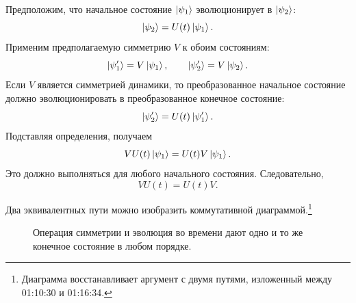 Предположим, что начальное состояние \(\left\lvert\psi_1\right\rangle\) эволюционирует в \(\left\lvert\psi_2\right\rangle\):
\begin{equation}
\left\lvert\psi_2\right\rangle=U(t)\left\lvert\psi_1\right\rangle.
\end{equation}
Применим предполагаемую симметрию \(V\) к обоим состояниям:
\begin{equation}
\left\lvert\psi_1'\right\rangle=V\left\lvert\psi_1\right\rangle,
\qquad
\left\lvert\psi_2'\right\rangle=V\left\lvert\psi_2\right\rangle.
\end{equation}
Если \(V\) является симметрией динамики, то преобразованное начальное состояние должно эволюционировать в преобразованное конечное состояние:
\begin{equation}
\left\lvert\psi_2'\right\rangle=U(t)\left\lvert\psi_1'\right\rangle.
\end{equation}
Подставляя определения, получаем
\begin{equation}
VU(t)\left\lvert\psi_1\right\rangle
=
U(t)V\left\lvert\psi_1\right\rangle.
\end{equation}
Это должно выполняться для любого начального состояния. Следовательно,
\begin{equation}
VU(t)=U(t)V.
\end{equation}

Два эквивалентных пути можно изобразить коммутативной диаграммой.\footnote{Диаграмма восстанавливает аргумент с двумя путями, изложенный между 01:10:30 и 01:16:34.}
\begin{figure}
\centering
{}
\caption{Операция симметрии и эволюция во времени дают одно и то же конечное состояние в любом порядке.}
\end{figure}

\begin{classroomqa}
\end{classroomqa}

\begin{classroomqa}
\end{classroomqa}

